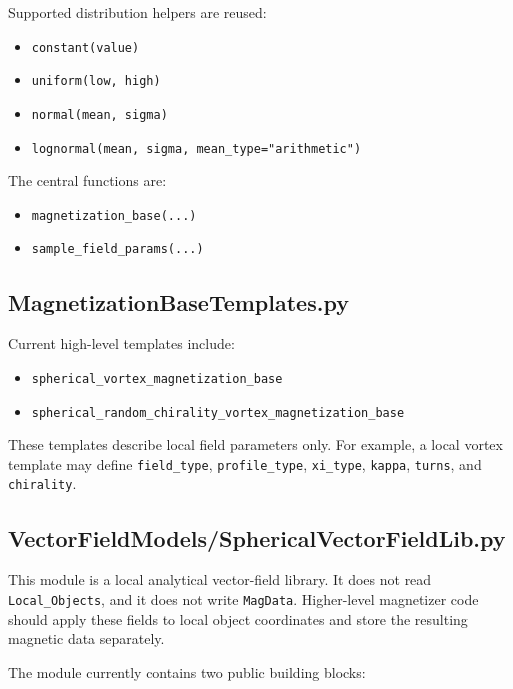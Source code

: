\documentclass[11pt,a4paper]{article}
\begin{document}
Supported distribution helpers are reused:

\begin{itemize}[nosep]
    \item \texttt{constant(value)}
    \item \texttt{uniform(low, high)}
    \item \texttt{normal(mean, sigma)}
    \item \texttt{lognormal(mean, sigma, mean\_type="arithmetic")}
\end{itemize}

The central functions are:

\begin{itemize}[nosep]
    \item \texttt{magnetization\_base(...)}
    \item \texttt{sample\_field\_params(...)}
\end{itemize}

\subsection{MagnetizationBaseTemplates.py}

Current high-level templates include:

\begin{itemize}[nosep]
    \item \texttt{spherical\_vortex\_magnetization\_base}
    \item \texttt{spherical\_random\_chirality\_vortex\_magnetization\_base}
\end{itemize}

These templates describe local field parameters only. For example, a local
vortex template may define \texttt{field\_type}, \texttt{profile\_type},
\texttt{xi\_type}, \texttt{kappa}, \texttt{turns}, and \texttt{chirality}.

\subsection{VectorFieldModels/SphericalVectorFieldLib.py}

This module is a local analytical vector-field library. It does not read
\texttt{Local\_Objects}, and it does not write \texttt{MagData}. Higher-level
magnetizer code should apply these fields to local object coordinates and
store the resulting magnetic data separately.

The module currently contains two public building blocks:
\end{document}
